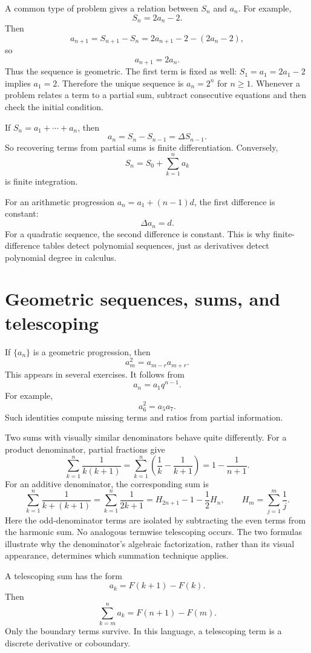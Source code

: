 A common type of problem gives a relation between \(S_n\) and \(a_n\).  For example,
\[
  S_n=2a_n-2.
\]
Then
\[
  a_{n+1}=S_{n+1}-S_n=2a_{n+1}-2-(2a_n-2),
\]
so
\[
  a_{n+1}=2a_n.
\]
Thus the sequence is geometric.  The first term is fixed as well: \(S_1=a_1=2a_1-2\) implies \(a_1=2\). Therefore the unique sequence is \(a_n=2^n\) for \(n\ge1\). Whenever a problem relates a term to a partial sum, subtract consecutive equations and then check the initial condition.

If \(S_n=a_1+\cdots+a_n\), then
\[
  a_n=S_n-S_{n-1}=\Delta S_{n-1}.
\]
So recovering terms from partial sums is finite differentiation.  Conversely,
\[
  S_n=S_0+\sum_{k=1}^{n}a_k
\]
is finite integration.

For an arithmetic progression \(a_n=a_1+(n-1)d\), the first difference is constant:
\[
  \Delta a_n=d.
\]
For a quadratic sequence, the second difference is constant.  This is why finite-difference tables detect polynomial sequences, just as derivatives detect polynomial degree in calculus.

\section{Geometric sequences, sums, and telescoping}

If \(\{a_n\}\) is a geometric progression, then
\[
  a_m^2=a_{m-r}a_{m+r}.
\]
This appears in several exercises.  It follows from
\[
  a_n=a_1q^{n-1}.
\]
For example,
\[
  a_6^2=a_5a_7.
\]
Such identities compute missing terms and ratios from partial information.

Two sums with visually similar denominators behave quite differently. For a product denominator, partial fractions give
\[
 \sum_{k=1}^n\frac1{k(k+1)}
 =\sum_{k=1}^n\left(\frac1k-\frac1{k+1}\right)
 =1-\frac1{n+1}.
\]
For an additive denominator, the corresponding sum is
\[
 \sum_{k=1}^n\frac1{k+(k+1)}
 =\sum_{k=1}^n\frac1{2k+1}
 =H_{2n+1}-1-\frac12H_n,
 \qquad H_m=\sum_{j=1}^m\frac1j.
\]
Here the odd-denominator terms are isolated by subtracting the even terms from the harmonic sum. No analogous termwise telescoping occurs. The two formulas illustrate why the denominator's algebraic factorization, rather than its visual appearance, determines which summation technique applies.

A telescoping sum has the form
\[
  a_k=F(k+1)-F(k).
\]
Then
\[
  \sum_{k=m}^{n}a_k=F(n+1)-F(m).
\]
Only the boundary terms survive.  In this language, a telescoping term is a discrete derivative or coboundary.

